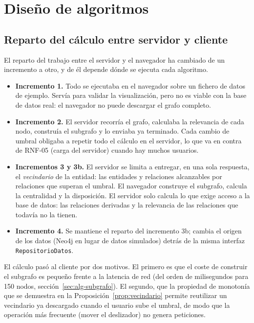 \section{Diseño de algoritmos}
\label{sec:algoritmos}

\subsection{Reparto del cálculo entre servidor y cliente}
\label{sec:reparto}

El reparto del trabajo entre el servidor y el navegador ha cambiado de un incremento a otro, y de él depende dónde se ejecuta cada algoritmo.

\begin{itemize}
  \item \textbf{Incremento 1.} Todo se ejecutaba en el navegador sobre un fichero de datos de ejemplo. Servía para validar la visualización, pero no es viable con la base de datos real: el navegador no puede descargar el grafo completo.
  \item \textbf{Incremento 2.} El servidor recorría el grafo, calculaba la relevancia de cada nodo, construía el subgrafo y lo enviaba ya terminado. Cada cambio de umbral obligaba a repetir todo el cálculo en el servidor, lo que va en contra de RNF-05 (carga del servidor) cuando hay muchos usuarios.
  \item \textbf{Incrementos 3 y 3b.} El servidor se limita a entregar, en una sola respuesta, el \emph{vecindario} de la entidad: las entidades y relaciones alcanzables por relaciones que superan el umbral. El navegador construye el subgrafo, calcula la centralidad y la disposición. El servidor solo calcula lo que exige acceso a la base de datos: las relaciones derivadas y la relevancia de las relaciones que todavía no la tienen.
  \item \textbf{Incremento 4.} Se mantiene el reparto del incremento 3b; cambia el origen de los datos (Neo4j en lugar de datos simulados) detrás de la misma interfaz \texttt{RepositorioDatos}.
\end{itemize}

El cálculo pasó al cliente por dos motivos. El primero es que el coste de construir el subgrafo es pequeño frente a la latencia de red (del orden de milisegundos para 150 nodos, sección~\ref{sec:alg-subgrafo}). El segundo, que la propiedad de monotonía que se demuestra en la Proposición~\ref{prop:vecindario} permite reutilizar un vecindario ya descargado cuando el usuario sube el umbral, de modo que la operación más frecuente (mover el deslizador) no genera peticiones.

